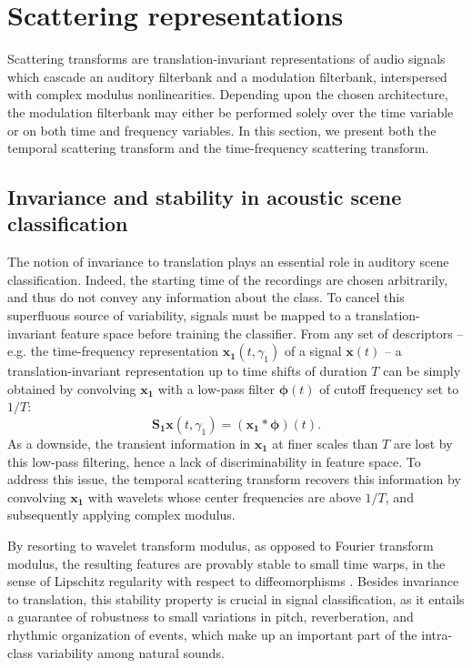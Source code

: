 \documentclass[journal]{IEEEtran}
\makeatletter
\newcommand*{\eg}{e.g.\@\xspace}
\makeatother
\begin{document}
\section{Scattering representations \label{sec:scattering}}

Scattering transforms are translation-invariant representations of audio signals which cascade an auditory filterbank and a modulation filterbank, interspersed with complex modulus nonlinearities.
Depending upon the chosen architecture, the modulation filterbank may either be performed solely over the time variable or on both time and frequency variables.
In this section, we present both the temporal scattering transform and the time-frequency scattering transform.

\subsection{Invariance and stability in acoustic scene classification}
The notion of invariance to translation plays an essential role in auditory scene classification.
Indeed, the starting time of the recordings are chosen arbitrarily, and thus do not convey any information about the class.
To cancel this superfluous source of variability, signals must be mapped to a translation-invariant feature space before training the classifier.
From any set of descriptors -- \eg the time-frequency representation $\boldsymbol{x_1}(t,\gamma_1)$ of  a signal $\boldsymbol{x}(t)$ --
a translation-invariant representation up to time shifts of duration $T$ can be simply obtained
by convolving $\boldsymbol{x_1}$ with a low-pass filter $\boldsymbol{\phi}(t)$ of cutoff frequency
set to $1/T$:
\begin{equation}
\mathbf{S_1}\boldsymbol{x}(t, \gamma_1) = (\boldsymbol{x_1} \ast \boldsymbol{\phi}) (t).
\end{equation}
As a downside, the transient information in $\boldsymbol{x_1}$ at finer scales than $T$ are lost by this low-pass filtering, hence a lack of discriminability in feature space.
To address this issue, the temporal scattering transform recovers this information by convolving $\boldsymbol{x_1}$ with wavelets whose center frequencies are above $1/T$, and subsequently applying complex modulus.

By resorting to wavelet transform modulus, as opposed to Fourier transform modulus, the resulting features are provably stable to small time warps,
in the sense of Lipschitz regularity with respect to diffeomorphisms \cite{Mallat2012}.
Besides invariance to translation, this stability property is crucial in signal classification, as it entails a guarantee of robustness to small variations in pitch, reverberation, and rhythmic organization of events, which make up an important part of the intra-class variability among natural sounds.
\end{document}
